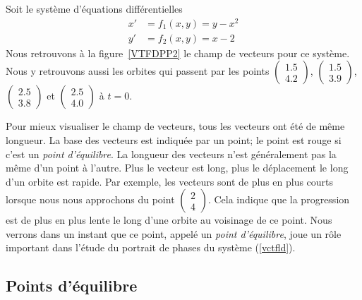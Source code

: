{\begin{egg}
Soit le système d'équations différentielles
\begin{equation}\label{vctfld}
\begin{split}
x' &= f_1(x,y) = y - x^2 \\
y' &= f_2(x,y) = x - 2
\end{split}
\end{equation}
Nous retrouvons à la figure~\ref{VTFDPP2} le champ de vecteurs pour ce
système.  Nous y retrouvons aussi les orbites qui passent par les points
$\displaystyle \begin{pmatrix} 1.5 \\ 4.2 \end{pmatrix}$,
$\displaystyle \begin{pmatrix} 1.5 \\ 3.9 \end{pmatrix}$,
$\displaystyle \begin{pmatrix} 2.5 \\ 3.8 \end{pmatrix}$ et
$\displaystyle \begin{pmatrix} 2.5 \\ 4.0 \end{pmatrix}$
à $t=0$.

Pour mieux visualiser le champ de vecteurs, tous les vecteurs ont été
de même longueur.  La base des vecteurs est indiquée par un point; le
point est rouge si c'est un {\em point d'équilibre}.   La longueur des
vecteurs n'est généralement pas la même d'un point à l'autre.   Plus
le vecteur est long, plus le déplacement le long d'un orbite est
rapide.   Par exemple, les vecteurs sont de plus en plus courts
lorsque nous nous approchons du point
$\displaystyle \begin{pmatrix} 2 \\ 4 \end{pmatrix}$.  Cela indique 
que la progression est de plus en plus lente le long d'une orbite au
voisinage de ce point.  Nous verrons dans un instant que ce point,
appelé un {\em point d'équilibre}, joue un rôle important dans l'étude
du portrait de phases du système (\ref{vctfld}).
\end{egg}


\subsection{Points d'équilibre}

}
